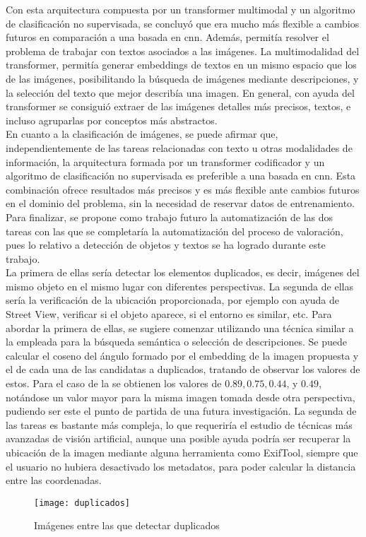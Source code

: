 	Con esta arquitectura compuesta por un transformer multimodal y un algoritmo de clasificación no supervisada, se concluyó que era mucho más flexible a cambios futuros en comparación a una basada en \gls{cnn}. Además, permitía resolver el problema de trabajar con textos asociados a las imágenes. La multimodalidad del transformer, permitía generar embeddings de textos en un mismo espacio que los de las imágenes, posibilitando la búsqueda de imágenes mediante descripciones, y la selección del texto que mejor describía una imagen. En general, con ayuda del transformer se consiguió extraer de las imágenes detalles más precisos, textos, e incluso agruparlas por conceptos más abstractos. \\
	
	En cuanto a la clasificación de imágenes, se puede afirmar que, independientemente de las tareas relacionadas con texto u otras modalidades de información, la arquitectura formada por un transformer codificador y un algoritmo de clasificación no supervisada es preferible a una basada en \gls{cnn}. Esta combinación ofrece resultados más precisos y es más flexible ante cambios futuros en el dominio del problema, sin la necesidad de reservar datos de entrenamiento. Para finalizar, se propone como trabajo futuro la automatización de las dos tareas con las que se completaría la automatización del proceso de valoración, pues lo relativo a detección de objetos y textos se ha logrado durante este trabajo. \\
	
	La primera de ellas sería detectar los elementos duplicados, es decir, imágenes del mismo objeto en el mismo lugar con diferentes perspectivas. La segunda de ellas sería la verificación de la ubicación proporcionada, por ejemplo  con ayuda de Street View, verificar si el objeto aparece, si el entorno es similar, etc. Para abordar la primera de ellas, se sugiere comenzar utilizando una técnica similar a la empleada para la búsqueda semántica o selección de descripciones. Se puede calcular el coseno del ángulo formado por el embedding de la imagen propuesta y el de cada una de las candidatas a duplicados, tratando de observar los valores de estos. Para el caso de la  se obtienen los valores de $0.89, 0.75, 0.44$, y $0.49$, notándose un valor mayor para la misma imagen tomada desde otra perspectiva, pudiendo ser este el punto de partida de una futura investigación. La segunda de las tareas es bastante más compleja, lo que requeriría el estudio de técnicas más avanzadas de visión artificial, aunque una posible ayuda podría ser recuperar la ubicación de la imagen mediante alguna herramienta como ExifTool, siempre que el usuario no hubiera desactivado los metadatos, para poder calcular la distancia entre las coordenadas. 
	
	\begin{figure}[!h]
		\centering
		\texttt{[image: duplicados]}
		\caption{Imágenes entre las que detectar duplicados}
		\label{fig:duplicados}
	\end{figure}